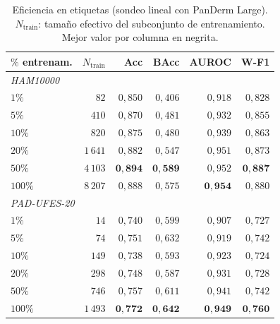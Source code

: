 \begin{table}[H]
\centering
\footnotesize
\setlength{\tabcolsep}{4pt}
\renewcommand{\arraystretch}{0.95}
\caption{Eficiencia en etiquetas (sondeo lineal con PanDerm Large).
$N_{\mathrm{train}}$: tamaño efectivo del subconjunto de
entrenamiento. Mejor valor por columna en negrita.}
\label{tab:label-eff}
\begin{tabular}{lrrrrr}
\hline
$\%$ entrenam.  & $N_{\mathrm{train}}$ & Acc           & BAcc          & AUROC         & W-F1 \\
\hline
\multicolumn{6}{l}{\textit{HAM10000}} \\
$1\%$           & $82$                 & $0{,}850$     & $0{,}406$     & $0{,}918$     & $0{,}828$ \\
$5\%$           & $410$                & $0{,}870$     & $0{,}481$     & $0{,}932$     & $0{,}855$ \\
$10\%$          & $820$                & $0{,}875$     & $0{,}480$     & $0{,}939$     & $0{,}863$ \\
$20\%$          & $1\,641$             & $0{,}882$     & $0{,}547$     & $0{,}951$     & $0{,}873$ \\
$50\%$          & $4\,103$             & $\mathbf{0{,}894}$ & $\mathbf{0{,}589}$ & $0{,}952$ & $\mathbf{0{,}887}$ \\
$100\%$         & $8\,207$             & $0{,}888$     & $0{,}575$     & $\mathbf{0{,}954}$ & $0{,}880$ \\
\hline
\multicolumn{6}{l}{\textit{PAD-UFES-20}} \\
$1\%$           & $14$                 & $0{,}740$     & $0{,}599$     & $0{,}907$     & $0{,}727$ \\
$5\%$           & $74$                 & $0{,}751$     & $0{,}632$     & $0{,}919$     & $0{,}742$ \\
$10\%$          & $149$                & $0{,}738$     & $0{,}593$     & $0{,}923$     & $0{,}724$ \\
$20\%$          & $298$                & $0{,}748$     & $0{,}587$     & $0{,}931$     & $0{,}728$ \\
$50\%$          & $746$                & $0{,}757$     & $0{,}611$     & $0{,}941$     & $0{,}742$ \\
$100\%$         & $1\,493$             & $\mathbf{0{,}772}$ & $\mathbf{0{,}642}$ & $\mathbf{0{,}949}$ & $\mathbf{0{,}760}$ \\
\hline
\end{tabular}
\end{table}


